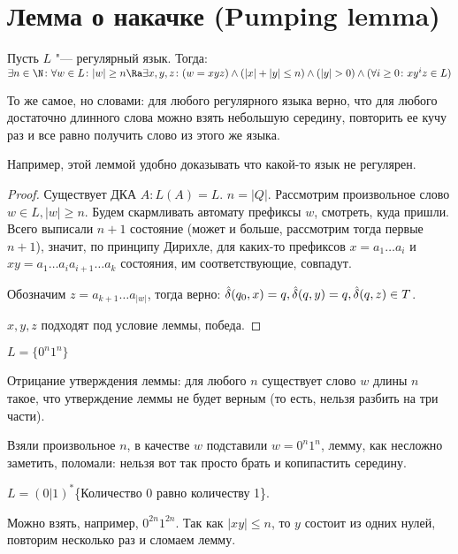 \section{Лемма о накачке (Pumping lemma)}
\begin{theorem}
Пусть $L$ "--- регулярный язык. Тогда: $\exists n \in \N \colon \forall w \in L \colon |w| \geq n \Ra \exists x, y, z \colon (w=xyz) \land (|x| + |y| \leq n) \land (|y| > 0) \land (\forall i \geq 0\colon xy^iz \in L)$ 

То же самое, но словами: для любого регулярного языка верно, что для любого достаточно длинного слова можно взять небольшую середину, повторить ее кучу раз и все равно получить слово из этого же языка.

Например, этой леммой удобно доказывать что какой-то язык не регулярен.
\end{theorem}
\begin{proof}
Существует ДКА $A \colon L(A) = L$. $n = |Q|$. Рассмотрим произвольное слово $w \in L, |w| \geq n$.
Будем скармливать автомату префиксы $w$, смотреть, куда пришли. Всего выписали $n+1$ состояние (может и больше, рассмотрим тогда первые $n + 1$), значит, 
по принципу Дирихле, для каких-то префиксов $x = a_1 \dots a_i$ и $xy = a_1 \dots a_ia_{i+1} \dots a_k$ состояния, им соответствующие, совпадут.

Обозначим $z = a_{k+1}\dots a_{|w|}$, тогда верно: 
$\\
\hat\delta(q_0, x) = q,\\ 
\hat\delta(q, y) = q,\\
\hat\delta(q, z) \in T$.

$x, y, z$ подходят под условие леммы, победа.

\end{proof}              
\begin{exmp}
$L = \{0^n1^n\}$

Отрицание утверждения леммы: для любого $n$ существует слово $w$ длины $n$ такое, что утверждение леммы не будет верным (то есть, нельзя разбить на три части).


Взяли произвольное $n$, в качестве $w$ подставили $w=0^n1^n$, лемму, как несложно заметить, поломали: нельзя вот так просто брать и копипастить середину.
\end{exmp}
\begin{exmp}
$L = (0|1)^*$\{Количество 0 равно количеству 1\}.

Можно взять, например, $0^{2n}1^{2n}$. Так как $|xy| \leq n$, то $y$ состоит из одних нулей, повторим несколько раз и сломаем лемму.
\end{exmp}
